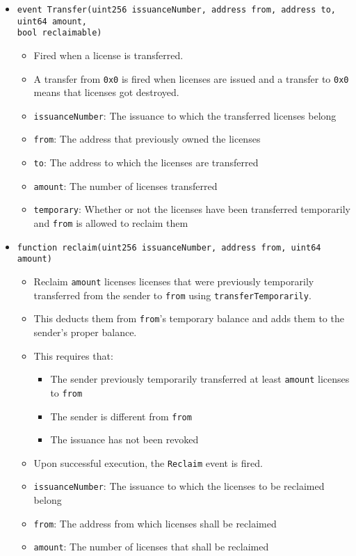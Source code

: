 \documentclass[a4paper]{article}
\begin{document}
\begin{itemize}
  \item \texttt{event Transfer(uint256 issuanceNumber, address from, address to, uint64 amount, \\bool reclaimable)}
  \begin{itemize}
    \item Fired when a license is transferred. 
    \item A transfer from \texttt{0x0} is fired when licenses are issued and a transfer to \texttt{0x0} means that licenses got destroyed.
    \item \texttt{issuanceNumber}: The issuance to which the transferred licenses belong
    \item \texttt{from}: The address that previously owned the licenses
    \item \texttt{to}: The address to which the licenses are transferred
    \item \texttt{amount}: The number of licenses transferred
    \item \texttt{temporary}: Whether or not the licenses have been transferred temporarily and \texttt{from} is allowed to reclaim them
  \end{itemize}
  
  \item \texttt{function reclaim(uint256 issuanceNumber, address from, uint64 amount)}
  \begin{itemize}
    \item Reclaim \texttt{amount} licenses licenses that were previously temporarily transferred from the sender to \texttt{from} using \texttt{transferTemporarily}. 
    \item This deducts them from \texttt{from}'s temporary balance and adds them to the sender's proper balance.
    \item This requires that:
    \begin{itemize}
      \item The sender previously temporarily transferred at least \texttt{amount} licenses to \texttt{from}
      \item The sender is different from \texttt{from}
      \item The issuance has not been revoked
    \end{itemize}
    \item Upon successful execution, the \texttt{Reclaim} event is fired.
    \item \texttt{issuanceNumber}: The issuance to which the licenses to be reclaimed belong
    \item \texttt{from}: The address from which licenses shall be reclaimed
    \item \texttt{amount}: The number of licenses that shall be reclaimed
  \end{itemize}
  

\end{itemize}
\end{document}
